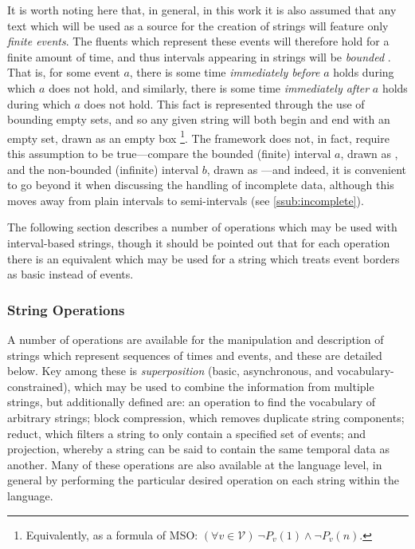 \documentclass[a4paper,12pt,leqno]{article}
\newcommand{\vph}[1]{\vphantom{#1}}
\newcommand{\ebox}[1]{\fbox{$\vph{'(),}#1$}}
\newcommand{\V}{\mathcal{V}}
\newcommand{\EventString}[1]{%
	\renewcommand*{\do}[1]{\ebox{##1}}%
	\PipeParser{#1}%
}
\begin{document}
It is worth noting here that, in general, in this work it is also assumed that any text which will be used as a source for the creation of strings will feature only \textit{finite events}. The fluents which represent these events will therefore hold for a finite amount of time, and thus intervals appearing in strings will be \textit{bounded} \citep{allen1994actions}. That is, for some event $a$, there is some time \textit{immediately before} $a$ holds during which $a$ does not hold, and similarly, there is some time \textit{immediately after} $a$ holds during which $a$ does not hold. This fact is represented through the use of bounding empty sets, and so any given string will both begin and end with an empty set, drawn as an empty box \ebox{}\footnote{Equivalently, as a formula of MSO: $(\forall v \in \V)~ \lnot P_v(1) \land \lnot P_v(n)$.}. The framework does not, in fact, require this assumption to be true---compare the bounded (finite) interval $a$, drawn as \EventString{{}|a|{}}, and the non-bounded (infinite) interval $b$, drawn as \EventString{b}---and indeed, it is convenient to go beyond it when discussing the handling of incomplete data, although this moves away from plain intervals to semi-intervals (see \cref{ssub:incomplete}).

The following section describes a number of operations which may be used with interval-based strings, though it should be pointed out that for each operation there is an equivalent which may be used for a string which treats event borders as basic instead of events.

\subsubsection{String Operations}\label{ssub:operations}
A number of operations are available for the manipulation and description of strings which represent sequences of times and events, and these are detailed below. Key among these is \textit{superposition} (basic, asynchronous, and vocabulary-constrained), which may be used to combine the information from multiple strings, but additionally defined are: an operation to find the vocabulary of arbitrary strings; block compression, which removes duplicate string components; reduct, which filters a string to only contain a specified set of events; and projection, whereby a string can be said to contain the same temporal data as another. Many of these operations are also available at the language level, in general by performing the particular desired operation on each string within the language.
\end{document}
